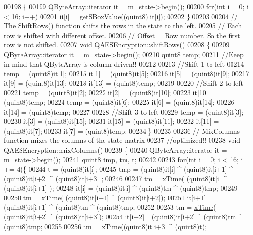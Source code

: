 \begin{DoxyCode}
00198 \{
00199   QByteArray::iterator it = m\_state->begin();
00200   \textcolor{keywordflow}{for}(\textcolor{keywordtype}{int} i = 0; i < 16; i++)
00201     it[i] = getSBoxValue((quint8) it[i]);
00202 \}
00203 
00204 \textcolor{comment}{// The ShiftRows() function shifts the rows in the state to the left.}
00205 \textcolor{comment}{// Each row is shifted with different offset.}
00206 \textcolor{comment}{// Offset = Row number. So the first row is not shifted.}
00207 \textcolor{keywordtype}{void} QAESEncryption::shiftRows()
00208 \{
00209     QByteArray::iterator it = m\_state->begin();
00210     quint8 temp;
00211     \textcolor{comment}{//Keep in mind that QByteArray is column-driven!!}
00212 
00213      \textcolor{comment}{//Shift 1 to left}
00214     temp   = (quint8)it[1];
00215     it[1]  = (quint8)it[5];
00216     it[5]  = (quint8)it[9];
00217     it[9]  = (quint8)it[13];
00218     it[13] = (quint8)temp;
00219 
00220     \textcolor{comment}{//Shift 2 to left}
00221     temp   = (quint8)it[2];
00222     it[2]  = (quint8)it[10];
00223     it[10] = (quint8)temp;
00224     temp   = (quint8)it[6];
00225     it[6]  = (quint8)it[14];
00226     it[14] = (quint8)temp;
00227 
00228     \textcolor{comment}{//Shift 3 to left}
00229     temp   = (quint8)it[3];
00230     it[3]  = (quint8)it[15];
00231     it[15] = (quint8)it[11];
00232     it[11] = (quint8)it[7];
00233     it[7]  = (quint8)temp;
00234 \}
00235 
00236 \textcolor{comment}{// MixColumns function mixes the columns of the state matrix}
00237 \textcolor{comment}{//optimized!!}
00238 \textcolor{keywordtype}{void} QAESEncryption::mixColumns()
00239 \{
00240   QByteArray::iterator it = m\_state->begin();
00241   quint8 tmp, tm, t;
00242 
00243   \textcolor{keywordflow}{for}(\textcolor{keywordtype}{int} i = 0; i < 16; i += 4)\{
00244     t       = (quint8)it[i];
00245     tmp     =  (quint8)it[i] ^ (quint8)it[i+1] ^ (quint8)it[i+2] ^ (quint8)it[i+3] ;
00246 
00247     tm      = \hyperlink{qaesencryption_8cpp_a94a5c6f286db021d028ddc6f91a65f72}{xTime}( (quint8)it[i] ^ (quint8)it[i+1] );
00248     it[i]   = (quint8)it[i] ^ (quint8)tm ^ (quint8)tmp;
00249 
00250     tm      = \hyperlink{qaesencryption_8cpp_a94a5c6f286db021d028ddc6f91a65f72}{xTime}( (quint8)it[i+1] ^ (quint8)it[i+2]);
00251     it[i+1] = (quint8)it[i+1] ^ (quint8)tm ^ (quint8)tmp;
00252 
00253     tm      = \hyperlink{qaesencryption_8cpp_a94a5c6f286db021d028ddc6f91a65f72}{xTime}( (quint8)it[i+2] ^ (quint8)it[i+3]);
00254     it[i+2] =(quint8)it[i+2] ^ (quint8)tm ^ (quint8)tmp;
00255 
00256     tm      = \hyperlink{qaesencryption_8cpp_a94a5c6f286db021d028ddc6f91a65f72}{xTime}((quint8)it[i+3] ^ (quint8)t);

\end{DoxyCode}
